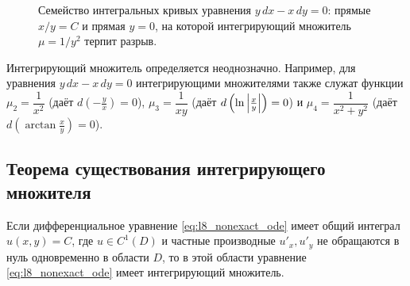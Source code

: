 \begin{figure}[H]
    \centering
    \caption{Семейство интегральных кривых уравнения $y \, dx - x \, dy = 0$:
    прямые $x / y = C$ и прямая $y = 0$, на которой интегрирующий множитель
    $\mu = 1 / y^2$ терпит разрыв.}
\end{figure}

\vspace{1 em}

\begin{remark}
    Интегрирующий множитель определяется неоднозначно. Например, для уравнения
    $y \, dx - x \, dy = 0$ интегрирующими множителями также служат функции
    $\mu_2 = \dfrac{1}{x^2}$ (даёт $d\left(-\frac{y}{x}\right) = 0$),
    $\mu_3 = \dfrac{1}{x y}$ (даёт $d\left(\ln \left| \frac{x}{y} \right|\right) = 0$) и
    $\mu_4 = \dfrac{1}{x^2 + y^2}$ (даёт $d\left(\arctan \frac{x}{y}\right) = 0$).
\end{remark}



\subsection{Теорема существования интегрирующего множителя}

\begin{theorem}
    Если дифференциальное уравнение \eqref{eq:l8_nonexact_ode} имеет общий
    интеграл $u(x, y) = C$, где $u \in C^1(D)$ и частные производные $u'_x, u'_y$
    не обращаются в нуль одновременно в области $D$, то в этой области
    уравнение \eqref{eq:l8_nonexact_ode} имеет интегрирующий множитель.
\end{theorem}

